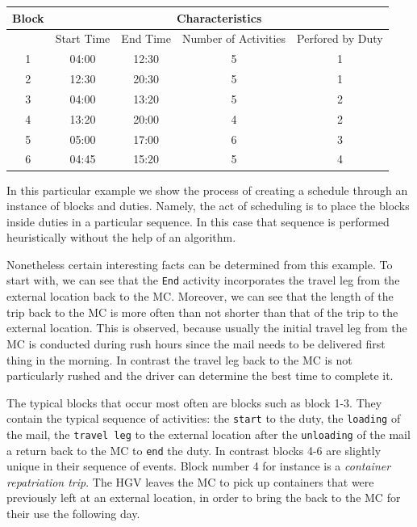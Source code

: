 \begin{table}[h]
\small
    \centering 
    \begin{tabular}{|c|c|c|c|c|}
        \hline
        \textbf{Block} & \multicolumn{4}{|c|}{ \textbf{Characteristics}} \\
        \hline
        & Start Time & End Time & Number of Activities & Perfored by Duty\\
        \hline
        1 & 04:00 & 12:30 & 5 & 1\\
        \hline
        2 & 12:30 & 20:30 & 5 & 1\\
        \hline
        3 & 04:00 & 13:20  & 5 & 2\\
        \hline
        4 & 13:20 & 20:00 & 4 & 2\\
        \hline
        5 & 05:00 & 17:00 & 6 & 3\\
        \hline
        6 & 04:45 & 15:20 & 5 & 4\\
        \hline
    \end{tabular}%
    \medbreak
\end{table}

\vspace{\baselineskip}
\noindent
In this particular example we show the process of creating a schedule through an instance of blocks and duties. Namely, the act of scheduling is to place the blocks inside duties in a particular sequence. In this case that sequence is performed heuristically without the help of an algorithm.

\vspace{\baselineskip}
\noindent
Nonetheless certain interesting facts can be determined from this example. To start with, we can see that the \texttt{End} activity incorporates the travel leg from the external location back to the MC. Moreover, we can see that the length of the trip back to the MC is more often than not shorter than that of the trip to the external location. This is observed, because usually the initial travel leg from the MC is conducted during rush hours since the mail needs to be delivered first thing in the morning. In contrast the travel leg back to the MC is not particularly rushed and the driver can determine the best time to complete it. 

\vspace{\baselineskip}
\noindent
The typical blocks that occur most often are blocks such as block 1-3. They contain the typical sequence of activities: the \texttt{start} to the duty, the \texttt{loading} of the mail, the \texttt{travel leg} to the external location after the \texttt{unloading} of the mail a return back to the MC to \texttt{end} the duty. In contrast  blocks 4-6 are slightly unique in their sequence of events. Block number 4 for instance is a \textit{container repatriation trip}. The HGV leaves the MC to pick up containers that were previously left at an external location, in order to bring the back to the MC for their use the following day.


